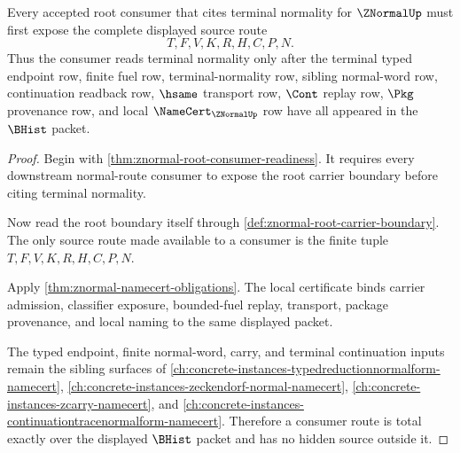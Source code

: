 \begin{theorem}
\label{thm:znormal-source-route-totality}
Every accepted root consumer that cites terminal normality for $\ZNormalUp$ must first expose the complete displayed source route
$$
T,F,V,K,R,H,C,P,N.
$$
Thus the consumer reads terminal normality only after the terminal typed endpoint row, finite fuel row, terminal-normality row, sibling normal-word row, continuation readback row, $\hsame$ transport row, $\Cont$ replay row, $\Pkg$ provenance row, and local $\NameCert_{\ZNormalUp}$ row have all appeared in the $\BHist$ packet.
\end{theorem}
\begin{proof}
Begin with \autoref{thm:znormal-root-consumer-readiness}. It requires every downstream normal-route consumer to expose the root carrier boundary before citing terminal normality.

Now read the root boundary itself through \autoref{def:znormal-root-carrier-boundary}. The only source route made available to a consumer is the finite tuple $T,F,V,K,R,H,C,P,N$.

Apply \autoref{thm:znormal-namecert-obligations}. The local certificate binds carrier admission, classifier exposure, bounded-fuel replay, transport, package provenance, and local naming to the same displayed packet.

The typed endpoint, finite normal-word, carry, and terminal continuation inputs remain the sibling surfaces of \autoref{ch:concrete-instances-typedreductionnormalform-namecert}, \autoref{ch:concrete-instances-zeckendorf-normal-namecert}, \autoref{ch:concrete-instances-zcarry-namecert}, and \autoref{ch:concrete-instances-continuationtracenormalform-namecert}. Therefore a consumer route is total exactly over the displayed $\BHist$ packet and has no hidden source outside it.
\end{proof}

